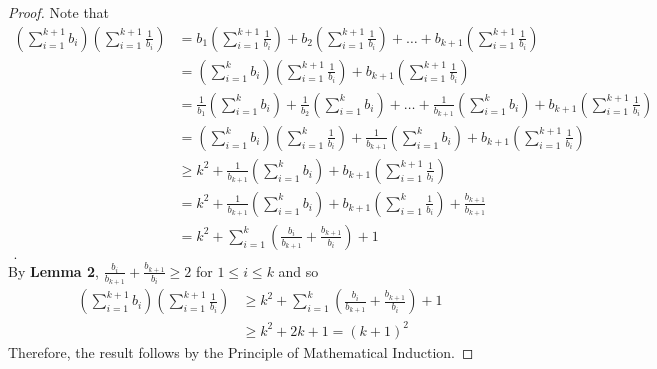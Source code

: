 \documentclass[12pt]{article}
\newenvironment{result}[2][Result]{\begin{trivlist}
		\item[\hskip \labelsep {\bfseries #1}\hskip \labelsep {\bfseries #2.}]}{\end{trivlist}}
\newenvironment{problem}[2][Problem]{\begin{trivlist}
		\item[\hskip \labelsep {\bfseries #1}\hskip \labelsep {\bfseries #2.}]}{\end{trivlist}}
\begin{document}
\begin{problem}{31}
\begin{result}{31}
\begin{proof}
	Note that
	\begin{align*}
		\left(\sum_{i=1}^{k+1}b_{i}\right)\left(\sum_{i=1}^{k+1}\frac{1}{b_{i}}\right) &= b_{1}\left(\sum_{i=1}^{k+1}\frac{1}{b_{i}}\right) + b_{2}\left(\sum_{i=1}^{k+1}\frac{1}{b_{i}}\right) + \ldots + b_{k+1}\left(\sum_{i=1}^{k+1}\frac{1}{b_{i}}\right)\\
		&= \left(\sum_{i=1}^{k}b_{i}\right)\left(\sum_{i=1}^{k+1}\frac{1}{b_{i}}\right) + b_{k+1}\left(\sum_{i=1}^{k+1}\frac{1}{b_{i}}\right)\\
		&= \frac{1}{b_{1}}\left(\sum_{i=1}^{k}b_{i}\right) + \frac{1}{b_{2}}\left(\sum_{i=1}^{k}b_{i}\right) + \ldots + \frac{1}{b_{k+1}}\left(\sum_{i=1}^{k}b_{i}\right) + b_{k+1}\left(\sum_{i=1}^{k+1}\frac{1}{b_{i}}\right)\\
		&= 	\left(\sum_{i=1}^{k}b_{i}\right)\left(\sum_{i=1}^{k}\frac{1}{b_{i}}\right) + \frac{1}{b_{k+1}}\left(\sum_{i=1}^{k}b_{i}\right) + b_{k+1}\left(\sum_{i=1}^{k+1}\frac{1}{b_{i}}\right)\\
		&\geq k^{2} + \frac{1}{b_{k+1}}\left(\sum_{i=1}^{k}b_{i}\right) + b_{k+1}\left(\sum_{i=1}^{k+1}\frac{1}{b_{i}}\right)\\
		&= k^{2} + \frac{1}{b_{k+1}}\left(\sum_{i=1}^{k}b_{i}\right) + b_{k+1}\left(\sum_{i=1}^{k}\frac{1}{b_{i}}\right) + \frac{b_{k+1}}{b_{k+1}}\\
		&= k^{2} + \sum_{i=1}^{k}\left(\frac{b_{i}}{b_{k+1}}+\frac{b_{k+1}}{b_{i}}\right) + 1\\.
	\end{align*}
		By \textbf{Lemma 2}, $\frac{b_{i}}{b_{k+1}}+\frac{b_{k+1}}{b_{i}} \geq 2$ for $1\leq i \leq k$ and so
		\begin{align*}
			\left(\sum_{i=1}^{k+1}b_{i}\right)\left(\sum_{i=1}^{k+1}\frac{1}{b_{i}}\right) &\geq k^{2} + \sum_{i=1}^{k}\left(\frac{b_{i}}{b_{k+1}}+\frac{b_{k+1}}{b_{i}}\right) + 1\\
			&\geq k^{2} + 2k +1 = (k+1)^{2} 
		\end{align*}
	Therefore, the result follows by the Principle of Mathematical Induction.
	\end{proof}
\end{result}
\end{problem}
\end{document}
